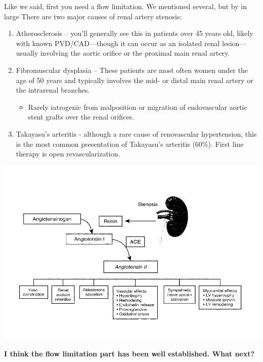 \documentclass[
]{book}
\providecommand{\tightlist}{%
  \setlength{\itemsep}{0pt}\setlength{\parskip}{0pt}}
\begin{document}
Like we said, first you need a flow limitation. We mentioned several,
but by in large There are two major causes of renal artery stenosis:

\begin{enumerate}
\def\labelenumi{\arabic{enumi}.}
\item
  Atherosclerosis -- you'll generally see this in patients over 45
  years old, likely with known PVD/CAD---though it can occur as an
  isolated renal lesion---usually involving the aortic orifice or the
  proximal main renal artery.
\item
  Fibromuscular dysplasia -- These patients are most often women under
  the age of 50 years and typically involves the mid- or distal main
  renal artery or the intrarenal branches.

  \begin{itemize}
  \tightlist
  \item
    Rarely iatrogenic from malposition or migration of endovascular
    aortic stent grafts over the renal orifices.
  \end{itemize}
\item
  Takayasu's arteritis - although a rare cause of renovascular
  hypertension, this is the most common presentation of Takayasu's
  arteritis (60\%). First line therapy is open revascularization.
  \citep{ehlert139TakayasuDisease2019, weaverRenalRevascularizationTakayasu2004, zhuTakayasuArteritisImaging2012}
\end{enumerate}

\includegraphics[width=13in]{images/renal1}

\textbf{I think the flow limitation part has been well established. What
next?}
\end{document}
